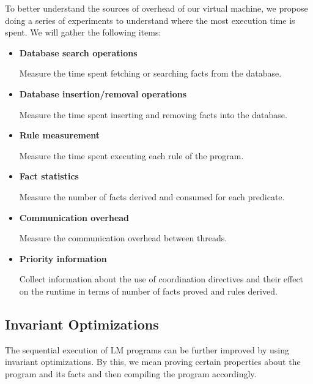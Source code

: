 To better understand the sources of overhead of our virtual machine, we propose doing a series
of experiments to understand where the most execution time is spent. We will gather the following
items:

\begin{itemize}
   \item \textbf{Database search operations}
   
   Measure the time spent fetching or searching facts from the database.
   
   \item \textbf{Database insertion/removal operations}
   
   Measure the time spent inserting and removing facts into the database.
   
   \item \textbf{Rule measurement}
   
   Measure the time spent executing each rule of the program.
   
   \item \textbf{Fact statistics}
   
   Measure the number of facts derived and consumed for each predicate.
   
   \item \textbf{Communication overhead}
   
   Measure the communication overhead between threads.

   \item \textbf{Priority information}

   Collect information about the use of coordination directives and their effect on the runtime in terms of number of facts proved and rules derived.
   
\end{itemize}

\subsection{Invariant Optimizations}

The sequential execution of LM programs can be further improved by using invariant optimizations.
By this, we mean proving certain properties about the program and its facts and then compiling the program accordingly.

